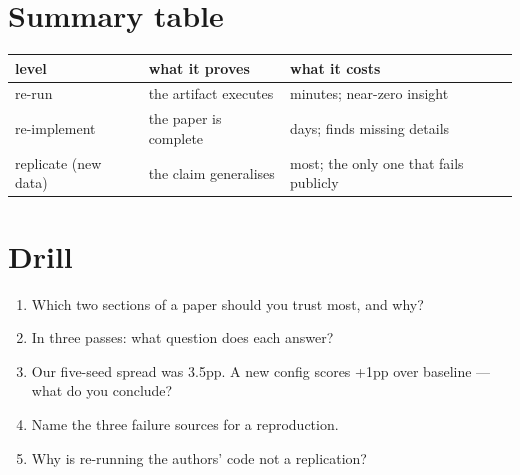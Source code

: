 \section{Summary table}
\label{sec:papersummary}

\begin{center}\small
\begin{tabular}{p{2.8cm}p{4.6cm}p{4.6cm}}
\toprule
level & what it proves & what it costs \\
\midrule
re-run & the artifact executes & minutes; near-zero insight \\
re-implement & the paper is complete & days; finds missing details \\
replicate (new data) & the claim generalises & most; the only one that fails publicly \\
\bottomrule
\end{tabular}
\end{center}

\section*{Drill}
\begin{enumerate}
\item Which two sections of a paper should you trust most, and why?
\item In three passes: what question does each answer?
\item Our five-seed spread was 3.5pp. A new config scores +1pp
over baseline --- what do you conclude?
\item Name the three failure sources for a reproduction.
\item Why is re-running the authors' code not a replication?
\end{enumerate}

